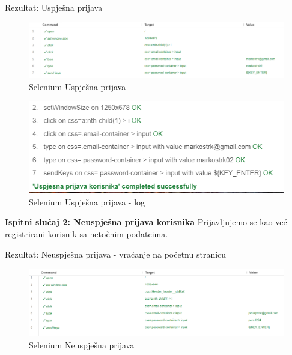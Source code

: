     Rezultat: Uspješna prijava

    \begin{figure}[H]
			\includegraphics[scale=0.5]{slike/UspjesnaPrijava1.png}
			\centering
			\caption{Selenium Uspješna prijava}
			\label{fig:promjene}
		          \end{figure}


\begin{figure}[H]
			\includegraphics[scale=0.8]{slike/UspjesnaPrijava2.png}
			\centering
			\caption{Selenium Uspješna prijava - log}
			\label{fig:promjene}
		          \end{figure}
    



    \textbf{Ispitni slučaj 2: Neuspješna prijava korisnika}
    Prijavljujemo se kao već registrirani korisnik sa netočnim podatcima. 
    
    Rezultat: Neuspješna prijava - vraćanje na početnu stranicu

    \begin{figure}[H]
			\includegraphics[scale=0.5]{slike/NeuspjesnaPrijava1.png}
			\centering
			\caption{Selenium Neuspješna prijava}
			\label{fig:promjene}
		          \end{figure}


